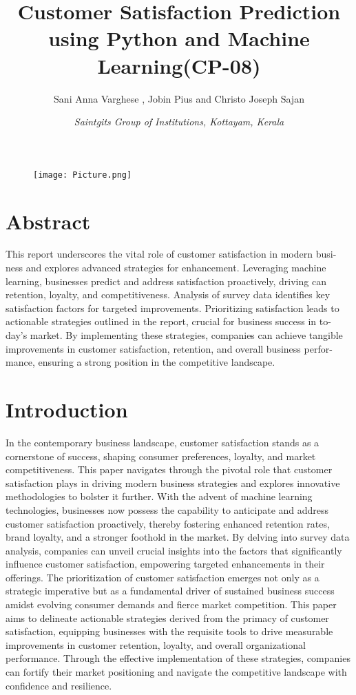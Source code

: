 \documentclass{article}
\title{\textbf{Customer Satisfaction Prediction using Python and Machine Learning(CP-08)}}
\author{Sani Anna Varghese , Jobin Pius and Christo Joseph Sajan}
\date{\textit{Saintgits Group of Institutions, Kottayam, Kerala}}
\begin{document}
\begin{figure}[t]
\texttt{[image: Picture.png]}

\end{figure}
\maketitle


\section{Abstract}
This report underscores the vital role of customer satisfaction in modern busi- ness and explores advanced strategies for enhancement. Leveraging machine learning, businesses predict and address satisfaction proactively, driving can retention, loyalty, and competitiveness. Analysis of survey data identifies key satisfaction factors for targeted improvements. Prioritizing satisfaction leads to actionable strategies outlined in the report, crucial for business success in to- day's market. By implementing these strategies, companies can achieve tangible improvements in customer satisfaction, retention, and overall business perfor- mance, ensuring a strong position in the competitive landscape.

\section{Introduction}
In the contemporary business landscape, customer satisfaction stands as a cornerstone of success, shaping consumer preferences, loyalty, and market competitiveness. This paper navigates through the pivotal role that customer satisfaction plays in driving modern business strategies and explores innovative methodologies to bolster it further. With the advent of machine learning technologies, businesses now possess the capability to anticipate and address customer satisfaction proactively, thereby fostering enhanced retention rates, brand loyalty, and a stronger foothold in the market.
By delving into survey data analysis, companies can unveil crucial insights into the factors that significantly influence customer satisfaction, empowering targeted enhancements in their offerings. The prioritization of customer satisfaction emerges not only as a strategic imperative but as a fundamental driver of sustained business success amidst evolving consumer demands and fierce market competition.
This paper aims to delineate actionable strategies derived from the primacy of customer satisfaction, equipping businesses with the requisite tools to drive measurable improvements in customer retention, loyalty, and overall organizational performance. Through the effective implementation of these strategies, companies can fortify their market positioning and navigate the competitive landscape with confidence and resilience.
\end{document}
